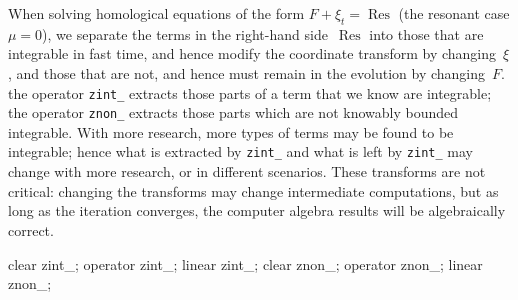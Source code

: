 \documentclass[11pt,a5paper]{article}
\newcommand{\res}{\operatorname{Res}}
\begin{document}
When solving homological equations of the form
$F+\xi_t=\res$ (the resonant case $\mu=0$), we separate the
terms in the right-hand side~$\res$ into those that are
integrable in fast time, and hence modify the coordinate
transform by changing~$\xi$, and those that are not, and
hence must remain in the evolution by changing~$F$.  the
operator \verb|zint_| extracts those parts of a term that we
know are integrable; the operator \verb|znon_| extracts
those parts which are not knowably bounded integrable. With
more research, more types of terms may be found to be
integrable; hence what is extracted by \verb|zint_| and what
is left by \verb|zint_| may change with more research, or in
different scenarios.  These transforms are not critical:
changing the transforms may change intermediate
computations, but as long as the iteration converges, the
computer algebra results will be algebraically correct.
\begin{reduce}
clear zint_; operator zint_; linear zint_;
clear znon_; operator znon_; linear znon_;
\end{reduce}
\end{document}

